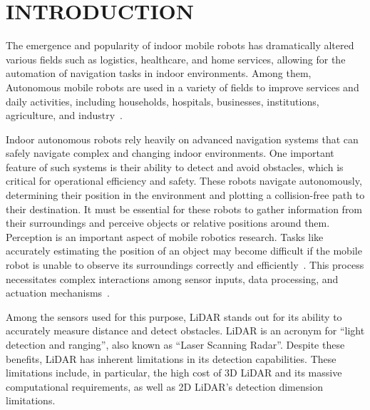 \section{INTRODUCTION}
\label{sec:introduction}

The emergence and popularity of indoor mobile robots has dramatically altered various fields 
such as logistics, healthcare, and home services, 
allowing for the automation of navigation tasks in indoor environments. 
Among them, Autonomous mobile robots are used in a variety of fields 
to improve services and daily activities, including households, hospitals, businesses, 
institutions, agriculture, and industry~\cite{reviewmobile}.

Indoor autonomous robots rely heavily on advanced navigation systems 
that can safely navigate complex and changing indoor environments. 
One important feature of such systems is their ability to detect and avoid obstacles, 
which is critical for operational efficiency and safety. 
These robots navigate autonomously, determining their position in the environment 
and plotting a collision-free path to their destination.
It must be essential for these robots to gather information from their surroundings 
and perceive objects or relative positions around them. 
Perception is an important aspect of mobile robotics research. 
Tasks like accurately estimating the position of an object may become difficult 
if the mobile robot is unable to observe its surroundings correctly and efficiently~\cite{reviewmobile}. 
This process necessitates complex interactions among sensor inputs, data processing, 
and actuation mechanisms~\cite{perception}.

Among the sensors used for this purpose, 
LiDAR stands out for its ability to accurately measure distance and detect obstacles. 
LiDAR is an acronym for ``light detection and ranging'', also known as ``Laser Scanning Radar''. 
Despite these benefits, LiDAR has inherent limitations in its detection capabilities. 
These limitations include, in particular, 
the high cost of 3D LiDAR and its massive computational requirements, 
as well as 2D LiDAR's detection dimension limitations.

